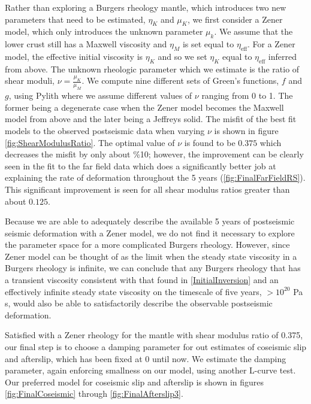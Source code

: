 \documentclass[12pt]{article}
\begin{document}
Rather than exploring a Burgers rheology mantle, which introduces two new parameters that need to be estimated, $\eta_{K}$ and $\mu_{K}$, we first consider a Zener model, which only introduces the unknown parameter $\mu_{k}$.  We assume that the lower crust still has a Maxwell viscosity and $\eta_{M}$ is set equal to $\eta_{\mathrm{eff}}$. For a Zener model, the effective initial viscosity is $\eta_{K}$ and so we set $\eta_K$ equal to $\eta_{\mathrm{eff}}$ inferred from above.  The unknown rheologic parameter which we estimate is the ratio of shear moduli, $\nu=\frac{\mu_K}{\mu_M}$. We compute nine different sets of Green's functions, $f$ and $g$, using Pylith where we assume different values of $\nu$ ranging from 0 to 1. The former being a degenerate case when the Zener model becomes the Maxwell model from above and the later being a Jeffreys solid.  The misfit of the best fit models to the observed postseismic data when varying $\nu$ is shown in figure \ref{fig:ShearModulusRatio}.  The optimal value of $\nu$ is found to be $0.375$ which decreases the misfit by only about \%10; however, the improvement can be clearly seen in the fit to the far field data which does a significantly better job at explaining the rate of deformation throughout the 5 years (\ref{fig:FinalFarFieldRS}).  This significant improvement is seen for all shear modulus  ratios greater than about $0.125$. 

Because we are able to adequately  describe the available 5 years of postseismic seismic deformation with a Zener model, we do not find it necessary to explore the parameter space for a more complicated Burgers rheology.  However, since Zener model can be thought of as the limit when the steady state viscosity in a Burgers rheology is infinite, we can conclude that any Burgers rheology that has a transient viscosity consistent with that found in \ref{InitialInversion} and an effectively infinite steady state viscosity on the timescale of five years, $>10^{20}$ Pa s, would also be able to satisfactorily describe the observable postseismic deformation.        

Satisfied with a Zener rheology for the mantle with shear modulus ratio of 0.375, our final step is to choose a damping parameter for out estimates of coseismic slip and afterslip, which has been fixed at 0 until now.  We estimate the damping parameter, again enforcing smallness on our model, using another L-curve test.  Our preferred model for coseismic slip and afterslip is shown in figures \ref{fig:FinalCoseismic} through \ref{fig:FinalAfterslip3}.  
\end{document}
